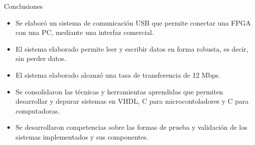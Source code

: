 \begin{frame}{Conclusiones}
	\begin{itemize}
		\item Se elaboró un sistema de comunicación USB que permite conectar una FPGA con una PC, mediante una interfaz comercial.
		\item El sistema elaborado permite leer y escribir datos en forma robusta, es decir, sin perder datos.
		\item El sistema elaborado alcanzó una tasa de transferencia de 12 Mbps.
		\item Se consolidaron las técnicas y herramientas aprendidas que permiten desarrollar y depurar sistemas en VHDL, C para microcontoladores y C para computadoras.
		\item Se desarrollaron competencias sobre las formas de prueba y validación de los sistemas implementados y sus componentes.
	\end{itemize}
\end{frame}
